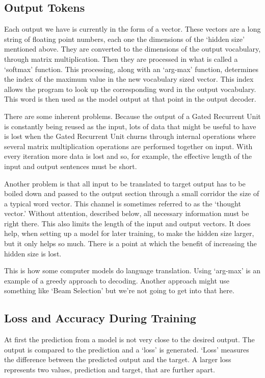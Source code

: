 \subsection{Output Tokens}
Each output we have is currently in the form of a vector. These vectors are a long string of floating point numbers, each one the dimensions of the `hidden size' mentioned above. They are converted to the dimensions of the output vocabulary, through matrix multiplication. Then they are processed in what is called a `softmax' function. This processing, along with an `arg-max' function, determines the index of the maximum value in the new vocabulary sized vector. This index allows the program to look up the corresponding word in the output vocabulary. This word is then used as the model output at that point in the output decoder.

There are some inherent problems. Because the output of a Gated Recurrent Unit is constantly being reused as the input, lots of data that might be useful to have is lost when the Gated Recurrent Unit churns through internal operations where several matrix multiplication operations are performed together on input. With every iteration more data is lost and so, for example, the effective length of the input and output sentences must be short. 

Another problem is that all input to be translated to target output has to be boiled down and passed to the output section through a small corridor the size of a typical word vector. This channel is sometimes referred to as the `thought vector.' Without attention, described below, all necessary information must be right there. This also limits the length of the input and output vectors. It does help, when setting up a model for later training, to make the hidden size larger, but it only helps so much. There is a point at which the benefit of increasing the hidden size is lost.

This is how some computer models do language translation. Using `arg-max' is an example of a greedy approach to decoding. Another approach might use something like `Beam Selection' but we're not going to get into that here.



\subsection{Loss and Accuracy During Training}

At first the prediction from a model is not very close to the desired output. The output is compared to the prediction and a `loss' is generated. `Loss' measures the difference between the predicted output and the target. A larger loss represents two values, prediction and target, that are further apart. 

